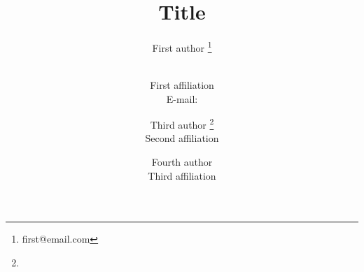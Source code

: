 \documentclass{PoS}
\title{Title}
\author{First author \thanks{first@email.com}}
\author{
\speaker{Second author is speaker}\\
First affiliation\\
E-mail: \email{second@email.com}
}
\author{Third author \thanks{\email{third@email.com}}\\Second affiliation}
\author{Fourth author\\Third affiliation}
\begin{document}
\blindmathpaper
\end{document}
